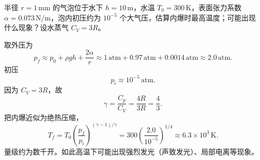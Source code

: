 \begin{question}
半径 $r=1\,\mathrm{mm}$ 的气泡位于水下 $h=10\,\mathrm m$，水温 $T_0=300\,\mathrm K$，表面张力系数 $\alpha=0.073\,\mathrm{N/m}$，泡内初压约为 $10^{-5}$ 个大气压，估算内爆时最高温度；可能出现什么现象？设水蒸气 $C_V=3R$。
\begin{solution}
取外压为
\[
p_f\approx p_0+\rho gh+\frac{2\alpha}{r}
\approx 1\,\text{atm}+0.97\,\text{atm}+0.0014\,\text{atm}
\approx 2.0\,\text{atm}.
\]
初压
\[
p_i\approx 10^{-5}\,\text{atm}.
\]
因为 $C_V=3R$，故
\[
\gamma=\frac{C_p}{C_V}=\frac{4R}{3R}=\frac43.
\]
把内爆近似为绝热压缩，
\[
T_f=T_0\left(\frac{p_f}{p_i}\right)^{(\gamma-1)/\gamma}
=300\left(\frac{2.0}{10^{-5}}\right)^{1/4}
\approx 6.3\times 10^3\,\mathrm K.
\]
量级约为数千开。如此高温下可能出现强烈发光（声致发光）、局部电离等现象。
\end{solution}
\end{question}


